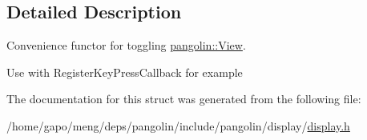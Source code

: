 \subsection{Detailed Description}
Convenience functor for toggling \hyperlink{structpangolin_1_1_view}{pangolin\+::\+View}. 

Use with Register\+Key\+Press\+Callback for example 

The documentation for this struct was generated from the following file\+:\begin{DoxyCompactItemize}
\item 
/home/gapo/meng/deps/pangolin/include/pangolin/display/\hyperlink{display_8h}{display.\+h}\end{DoxyCompactItemize}
